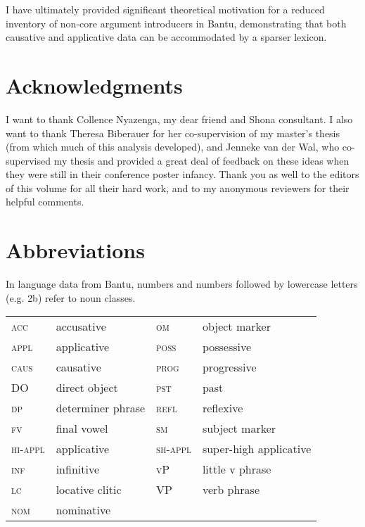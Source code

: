\documentclass[output=paper,modfonts,nonflat,colorlinks,citecolor=brown]{langsci/langscibook}
\begin{document}
I have ultimately provided significant theoretical motivation for a reduced inventory of non-core argument introducers in Bantu, demonstrating that both causative and applicative data can be accommodated by a sparser lexicon. 


\section*{Acknowledgments}\label{sec:wechsler:ack}

I want to thank Collence Nyazenga, my dear friend and Shona consultant. I also want to thank Theresa Biberauer for her co-supervision of my master’s thesis (from which much of this analysis developed), and Jenneke van der Wal, who co-supervised my thesis and provided a great deal of feedback on these ideas when they were still in their conference poster infancy. Thank you as well to the editors of this volume for all their hard work, and to my anonymous reviewers for their helpful comments.  

\section*{Abbreviations}\label{sec:wechsler:abb}

{{In} {language} {data} {from} {Bantu,} {numbers} {and} {numbers} {followed} {by} {lowercase} {letters} {(e.g.} {2b)} {refer} {to} {noun} {classes.}}

\begin{tabularx}{\textwidth}{lXlX}
\textsc{acc} &  accusative & \textsc{om} &  object marker\\
\textsc{appl} &  applicative & \textsc{poss} &  possessive\\
\textsc{caus} &  causative & \textsc{prog} &  progressive\\
DO\textsc{} &  direct object & \textsc{pst} &  past\\
\textsc{dp} &  determiner phrase & \textsc{refl} &  reflexive\\
\textsc{fv} &  final vowel & \textsc{sm} &  subject marker\\
\textsc{hi-appl} &  applicative & \textsc{sh-appl} &  super-high applicative\\
\textsc{inf} &  infinitive & \textsc{vP} &  little v phrase\\
\textsc{lc} &  locative clitic & \textsc{VP} &  verb phrase\\
\textsc{nom} &  nominative & \\ 
\end{tabularx}


\sloppy\printbibliography[heading=subbibliography,notkeyword=this]
\end{document}
